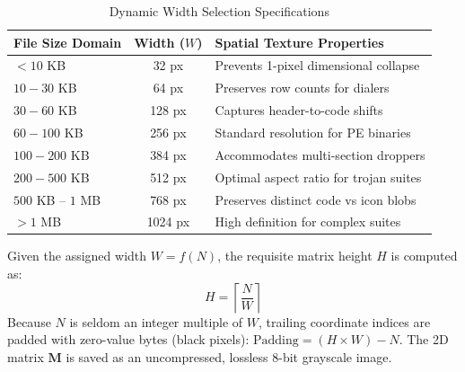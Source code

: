 \documentclass[journal,10pt,twocolumn]{IEEEtran}
\begin{document}
\begin{table}[!h]
\caption{Dynamic Width Selection Specifications\label{tab:width}}
\centering
\begin{tabular}{lcl}
\toprule
\textbf{File Size Domain} & \textbf{Width ($W$)} & \textbf{Spatial Texture Properties} \\
\midrule
$< 10$ KB & 32 px & Prevents 1-pixel dimensional collapse \\
$10 - 30$ KB & 64 px & Preserves row counts for dialers \\
$30 - 60$ KB & 128 px & Captures header-to-code shifts \\
$60 - 100$ KB & 256 px & Standard resolution for PE binaries \\
$100 - 200$ KB & 384 px & Accommodates multi-section droppers \\
$200 - 500$ KB & 512 px & Optimal aspect ratio for trojan suites \\
$500$ KB -- $1$ MB & 768 px & Preserves distinct code vs icon blobs \\
$> 1$ MB & 1024 px & High definition for complex suites \\
\bottomrule
\end{tabular}
\end{table}

Given the assigned width $W = f(N)$, the requisite matrix height $H$ is computed as:
\begin{equation}
H = \left\lceil \frac{N}{W} \right\rceil
\end{equation}
Because $N$ is seldom an integer multiple of $W$, trailing coordinate indices are padded with zero-value bytes (black pixels): $\text{Padding} = (H \times W) - N$. The 2D matrix $\mathbf{M}$ is saved as an uncompressed, lossless 8-bit grayscale image.
\end{document}
